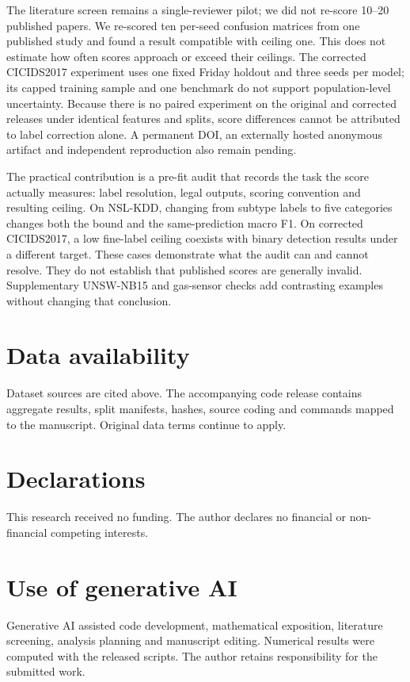 \documentclass[namedate,webpdf,contemporary,large]{TBench-template}
\begin{document}
The literature screen remains a single-reviewer pilot; we did not re-score 10--20 published papers. We re-scored ten per-seed confusion matrices from one published study and found a result compatible with ceiling one. This does not estimate how often scores approach or exceed their ceilings. The corrected CICIDS2017 experiment uses one fixed Friday holdout and three seeds per model; its capped training sample and one benchmark do not support population-level uncertainty. Because there is no paired experiment on the original and corrected releases under identical features and splits, score differences cannot be attributed to label correction alone. A permanent DOI, an externally hosted anonymous artifact and independent reproduction also remain pending.

The practical contribution is a pre-fit audit that records the task the score actually measures: label resolution, legal outputs, scoring convention and resulting ceiling. On NSL-KDD, changing from subtype labels to five categories changes both the bound and the same-prediction macro F1. On corrected CICIDS2017, a low fine-label ceiling coexists with binary detection results under a different target. These cases demonstrate what the audit can and cannot resolve. They do not establish that published scores are generally invalid. Supplementary UNSW-NB15 and gas-sensor checks add contrasting examples without changing that conclusion.

\section*{Data availability}
Dataset sources are cited above. The accompanying code release contains aggregate results, split manifests, hashes, source coding and commands mapped to the manuscript. Original data terms continue to apply.
\section*{Declarations}
This research received no funding. The author declares no financial or non-financial competing interests.
\section*{Use of generative AI}
Generative AI assisted code development, mathematical exposition, literature screening, analysis planning and manuscript editing. Numerical results were computed with the released scripts. The author retains responsibility for the submitted work.


\end{document}

